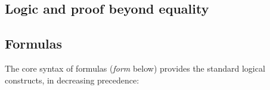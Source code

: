 %
\begin{isabellebody}%
\def\isabellecontext{Logic}%
%
\isadelimtheory
%
\endisadelimtheory
%
\isatagtheory
%
\endisatagtheory
{\isafoldtheory}%
%
\isadelimtheory
%
\endisadelimtheory
%
\begin{isamarkuptext}%
\vspace{-5ex}
\section{Logic and proof beyond equality}
\label{sec:Logic}

\subsection{Formulas}

The core syntax of formulas (\textit{form} below)
provides the standard logical constructs, in decreasing precedence:
\[
\begin{array}{rcl}


\end{array}\]
\end{isamarkuptext}
\end{isabellebody}

